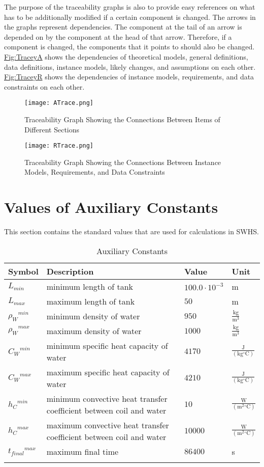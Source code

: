 \documentclass[12pt]{article}
\begin{document}
The purpose of the traceability graphs is also to provide easy references on what has to be additionally modified if a certain component is changed. The arrows in the graphs represent dependencies. The component at the tail of an arrow is depended on by the component at the head of that arrow. Therefore, if a component is changed, the components that it points to should also be changed. \hyperref[Figure:TraceyA]{Fig:TraceyA} shows the dependencies of theoretical models, general definitions, data definitions, instance models, likely changes, and assumptions on each other. \hyperref[Figure:TraceyR]{Fig:TraceyR} shows the dependencies of instance models, requirements, and data constraints on each other.
\begin{figure}
\begin{center}
\texttt{[image: ATrace.png]}
\caption{Traceability Graph Showing the Connections Between Items of Different Sections}
\label{Figure:TraceyA}
\end{center}
\end{figure}
\begin{figure}
\begin{center}
\texttt{[image: RTrace.png]}
\caption{Traceability Graph Showing the Connections Between Instance Models, Requirements, and Data Constraints}
\label{Figure:TraceyR}
\end{center}
\end{figure}
\section{Values of Auxiliary Constants}
\label{Sec:AuxConstants}
This section contains the standard values that are used for calculations in SWHS.
\begin{longtabu}{l X[l] l l}
\toprule
Symbol & Description & Value & Unit
\\
\midrule
${L_{min}}$ & minimum length of tank & $100.0\cdot{}10^{-3}$ & m
\\
${L_{max}}$ & maximum length of tank & $50$ & m
\\
${{ρ_{W}}^{min}}$ & minimum density of water & $950$ & $\frac{\text{kg}}{\text{m}^{3}}$
\\
${{ρ_{W}}^{max}}$ & maximum density of water & $1000$ & $\frac{\text{kg}}{\text{m}^{3}}$
\\
${{C_{W}}^{min}}$ & minimum specific heat capacity of water & $4170$ & $\frac{\text{J}}{(\text{kg}{}^{\circ}\text{C})}$
\\
${{C_{W}}^{max}}$ & maximum specific heat capacity of water & $4210$ & $\frac{\text{J}}{(\text{kg}{}^{\circ}\text{C})}$
\\
${{h_{C}}^{min}}$ & minimum convective heat transfer coefficient between coil and water & $10$ & $\frac{\text{W}}{(\text{m}^{2}{}^{\circ}\text{C})}$
\\
${{h_{C}}^{max}}$ & maximum convective heat transfer coefficient between coil and water & $10000$ & $\frac{\text{W}}{(\text{m}^{2}{}^{\circ}\text{C})}$
\\
${{t_{final}}^{max}}$ & maximum final time & $86400$ & s
\\
\bottomrule
\caption{Auxiliary Constants}
\label{Table:TAuxConsts}
\end{longtabu}
\end{document}
